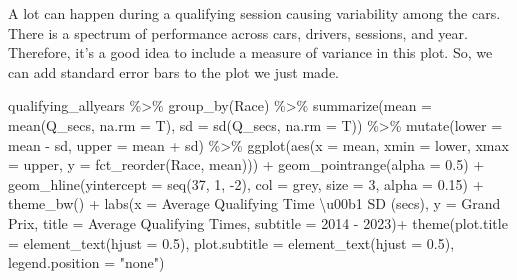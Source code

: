\documentclass[
]{book}
\newenvironment{Shaded}{\begin{snugshade}}{\end{snugshade}}
\newcommand{\AttributeTok}[1]{\textcolor[rgb]{0.77,0.63,0.00}{#1}}
\newcommand{\DecValTok}[1]{\textcolor[rgb]{0.00,0.00,0.81}{#1}}
\newcommand{\FloatTok}[1]{\textcolor[rgb]{0.00,0.00,0.81}{#1}}
\newcommand{\FunctionTok}[1]{\textcolor[rgb]{0.00,0.00,0.00}{#1}}
\newcommand{\NormalTok}[1]{#1}
\newcommand{\SpecialCharTok}[1]{\textcolor[rgb]{0.00,0.00,0.00}{#1}}
\newcommand{\StringTok}[1]{\textcolor[rgb]{0.31,0.60,0.02}{#1}}
\begin{document}
A lot can happen during a qualifying session causing variability among the cars. There is a spectrum of performance across cars, drivers, sessions, and year. Therefore, it's a good idea to include a measure of variance in this plot. So, we can add standard error bars to the plot we just made.

\begin{Shaded}
\begin{Highlighting}[]
\NormalTok{qualifying\_allyears }\SpecialCharTok{\%\textgreater{}\%}
  \FunctionTok{group\_by}\NormalTok{(Race) }\SpecialCharTok{\%\textgreater{}\%}
  \FunctionTok{summarize}\NormalTok{(}\AttributeTok{mean =} \FunctionTok{mean}\NormalTok{(Q\_secs, }\AttributeTok{na.rm =}\NormalTok{ T),}
            \AttributeTok{sd =} \FunctionTok{sd}\NormalTok{(Q\_secs, }\AttributeTok{na.rm =}\NormalTok{ T)) }\SpecialCharTok{\%\textgreater{}\%} 
  \FunctionTok{mutate}\NormalTok{(}\AttributeTok{lower =}\NormalTok{ mean  }\SpecialCharTok{{-}}\NormalTok{ sd,}
         \AttributeTok{upper =}\NormalTok{ mean }\SpecialCharTok{+}\NormalTok{ sd) }\SpecialCharTok{\%\textgreater{}\%} 
  \FunctionTok{ggplot}\NormalTok{(}\FunctionTok{aes}\NormalTok{(}\AttributeTok{x =}\NormalTok{ mean, }\AttributeTok{xmin =}\NormalTok{ lower, }\AttributeTok{xmax =}\NormalTok{ upper, }\AttributeTok{y =} \FunctionTok{fct\_reorder}\NormalTok{(Race, mean))) }\SpecialCharTok{+}
  \FunctionTok{geom\_pointrange}\NormalTok{(}\AttributeTok{alpha =} \FloatTok{0.5}\NormalTok{) }\SpecialCharTok{+}
  \FunctionTok{geom\_hline}\NormalTok{(}\AttributeTok{yintercept =} \FunctionTok{seq}\NormalTok{(}\DecValTok{37}\NormalTok{, }\DecValTok{1}\NormalTok{, }\SpecialCharTok{{-}}\DecValTok{2}\NormalTok{), }\AttributeTok{col =} \StringTok{\textquotesingle{}grey\textquotesingle{}}\NormalTok{, }\AttributeTok{size =} \DecValTok{3}\NormalTok{, }\AttributeTok{alpha =} \FloatTok{0.15}\NormalTok{) }\SpecialCharTok{+}
  \FunctionTok{theme\_bw}\NormalTok{() }\SpecialCharTok{+}
  \FunctionTok{labs}\NormalTok{(}\AttributeTok{x =} \StringTok{\textquotesingle{}Average Qualifying Time \textbackslash{}u00b1 SD (secs)\textquotesingle{}}\NormalTok{,}
       \AttributeTok{y =} \StringTok{\textquotesingle{}Grand Prix\textquotesingle{}}\NormalTok{,}
       \AttributeTok{title =} \StringTok{\textquotesingle{}Average Qualifying Times\textquotesingle{}}\NormalTok{,}
       \AttributeTok{subtitle =} \StringTok{\textquotesingle{}2014 {-} 2023\textquotesingle{}}\NormalTok{)}\SpecialCharTok{+}
  \FunctionTok{theme}\NormalTok{(}\AttributeTok{plot.title =} \FunctionTok{element\_text}\NormalTok{(}\AttributeTok{hjust =} \FloatTok{0.5}\NormalTok{),}
        \AttributeTok{plot.subtitle =} \FunctionTok{element\_text}\NormalTok{(}\AttributeTok{hjust =} \FloatTok{0.5}\NormalTok{),}
        \AttributeTok{legend.position =} \StringTok{"none"}\NormalTok{)}
\end{Highlighting}
\end{Shaded}
\end{document}
